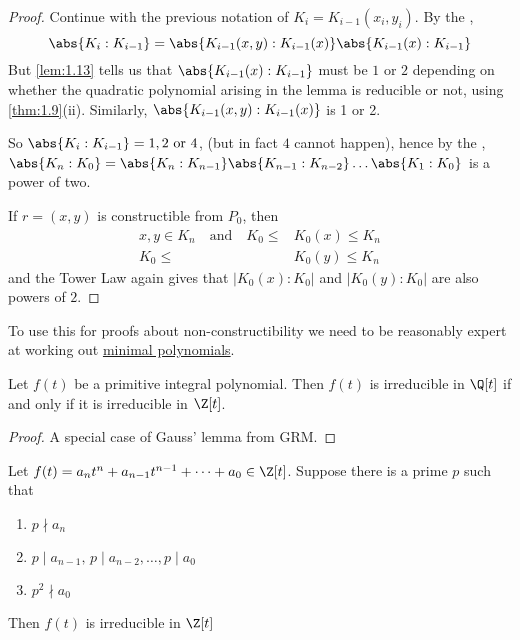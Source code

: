 \documentclass{article}
\begin{document}
\begin{proof}
    Continue with the previous notation of $K_i = K_{i-1}(x_i, y_i)$. By the ,
    \begin{equation*}
        \abs{K_i : K_{i-1}} = \abs{K_{i-1} (x, y): K_{i-1}(x)} \abs{K_{i-1}(x) : K_{i-1}}
    \end{equation*}
    But \cref{lem:1.13} tells us that $\abs{K_{i-1}(x):K_{i-1}}$ must be $1$ or $2$ depending on whether the quadratic polynomial arising in the lemma is reducible or not, using \cref{thm:1.9}(ii). Similarly, $\abs{K_{i-1}(x, y):K_{i-1}(x)}$ is 1 or 2.

    So $\abs{K_i: K_{i-1}} = 1, 2 \ \text{or} \ 4$, (but in fact $4$ cannot happen), hence by the , $\abs{K_n:K_0} = \abs{K_n:K_{n-1}} \abs{K_{n-1} : K_{n-2}} \dots \abs{K_1:K_0}$ is a power of two.

    If $r = (x, y)$ is constructible from $P_0$, then
    \begin{align*}
        x, y \in K_n \quad \text{and} \quad K_0 \leq &K_0(x) \leq K_n \\
        K_0 \leq &K_0(y) \leq K_n
    \end{align*}
    and the Tower Law again gives that $|K_0(x):K_0|$ and $|K_0(y):K_0|$ are also powers of $2$.
\end{proof}

To use this for proofs about non-constructibility we need to be reasonably expert at working out \hyperlink{def:minimalPoly}{minimal polynomials}.

\begin{nthm}\label{thm:1.15}
    Let $f(t)$ be a primitive integral polynomial.  Then $f(t)$ is irreducible in $\Q[t]$ if and only if it is irreducible in $\Z[t]$.
\end{nthm}

\begin{proof}
    A special case of Gauss' lemma from GRM.
\end{proof}

\begin{nthm}\label{thm:1.16}
    Let $f(t) = a_n t^n + a_{n-1} t^{n-1} + \dots + a_0 \in \Z[t]$.
    Suppose there is a prime $p$ such that
    \begin{enumerate}[label=(\roman*)]
        \item $p \nmid a_n$
        \item $p \mid a_{n-1}, \, p \mid a_{n-2}, \dotsc, p \mid a_0$
        \item $p^2 \nmid a_0$
    \end{enumerate}
    Then $f(t)$ is irreducible in $\Z[t]$
\end{nthm}
\end{document}
